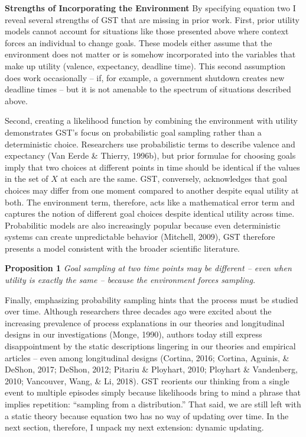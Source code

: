 \documentclass[english,,man]{apa6}
\theoremstyle{definition}
\theoremstyle{definition}
\theoremstyle{definition}
\theoremstyle{remark}
\begin{document}
\textbf{Strengths of Incorporating the Environment} By specifying
equation two I reveal several strengths of GST that are missing in prior
work. First, prior utility models cannot account for situations like
those presented above where context forces an individual to change
goals. These models either assume that the environment does not matter
or is somehow incorporated into the variables that make up utility
(valence, expectancy, deadline time). This second assumption does work
occasionally -- if, for example, a government shutdown creates new
deadline times -- but it is not amenable to the spectrum of situations
described above.

Second, creating a likelihood function by combining the environment with
utility demonstrates GST's focus on probabilistic goal sampling rather
than a deterministic choice. Researchers use probabilistic terms to
describe valence and expectancy (Van Eerde \& Thierry, 1996b), but prior
formulae for choosing goals imply that two choices at different points
in time should be identical if the values in the set of \(X\) at each
are the same. GST, conversely, acknowledges that goal choices may differ
from one moment compared to another despite equal utility at both. The
environment term, therefore, acts like a mathematical error term and
captures the notion of different goal choices despite identical utility
across time. Probabilitic models are also increasingly popular because
even deterministic systems can create unpredictable behavior (Mitchell,
2009), GST therefore presents a model consistent with the broader
scientific literature.

\textbf{Proposition 1} \emph{Goal sampling at two time points may be
different -- even when utility is exactly the same -- because the
environment forces sampling.}

Finally, emphasizing probability sampling hints that the process must be
studied over time. Although researchers three decades ago were excited
about the increasing prevalence of process explanations in our theories
and longitudinal designs in our investigations (Monge, 1990), authors
today still express disappointment by the static descriptions lingering
in our theories and empirical articles -- even among longitudinal
designs (Cortina, 2016; Cortina, Aguinis, \& DeShon, 2017; DeShon, 2012;
Pitariu \& Ployhart, 2010; Ployhart \& Vandenberg, 2010; Vancouver,
Wang, \& Li, 2018). GST reorients our thinking from a single event to
multiple episodes simply because likelihoods bring to mind a phrase that
implies repetition: \enquote{sampling from a distribution.} That said,
we are still left with a static theory because equation two has no way
of updating over time. In the next section, therefore, I unpack my next
extension: dynamic updating.
\end{document}
